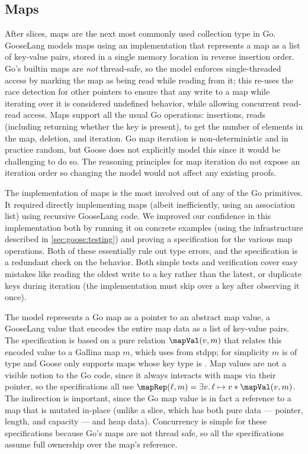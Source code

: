 \subsection{Maps}


After slices, maps are the next most commonly used collection type in
Go. GooseLang models maps using an implementation that represents a map as a
list of key-value pairs, stored in a single memory location in reverse insertion
order. Go's builtin maps are
\emph{not} thread-safe, so the model enforces single-threaded access by
marking the map as being read while reading from it; this re-uses the
race detection for other pointers to ensure that any write to a map while iterating
over it is considered
undefined behavior, while allowing concurrent read-read access. Maps
support all the usual Go operations: insertions, reads (including returning
whether the key is present),  to get the number of elements
in the map, deletion, and iteration. Go map iteration is
non-deterministic and in practice random, but Goose does not explicitly model this
since it would be challenging to do so. The reasoning
principles for map iteration do not expose an iteration order so changing the
model would not affect any existing proofs.

The implementation of maps is the most involved out of any of the Go
primitives. It required directly implementing maps (albeit
inefficiently, using an association list) using recursive GooseLang
code. We improved our confidence in this
implementation both by running it on concrete examples (using the infrastructure
described in \cref{sec:goose:testing}) and proving a specification for the
various map operations. Both of these
essentially rule out type errors,
and the specification is a redundant check on the behavior. Both simple tests and verification
cover easy mistakes like reading the oldest write to a key rather than
the latest, or duplicate keys during iteration (the implementation must
skip over a key after observing it once).

The model represents
a Go map as a pointer to an abstract map value, a GooseLang value
that encodes the entire map data as a list of key-value pairs. The
specification is based on a pure relation $\mapVal(v, m)$ that relates
this encoded value to a Gallina map $m$, which uses  from
stdpp; for simplicity $m$ is of type  and Goose only supports
maps whose key type is .
Map values are not a visible notion to the Go code, since
it always interacts with maps via their pointer, so the specifications
all use $\mapRep(\ell, m) = \exists v.\, \ell \mapsto v * \mapVal(v, m)$. The
indirection is important, since the Go map value
 is in fact a reference to a map that is
mutated in-place (unlike a slice, which has both pure data --- pointer,
length, and capacity --- and heap data). Concurrency is simple for these
specifications because Go's maps are not thread safe, so all the specifications
assume full ownership over the map's reference.

